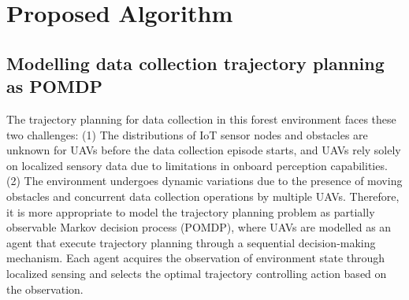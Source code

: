 \documentclass[conference]{IEEEtran}
\begin{document}
\section{Proposed Algorithm}\label{method}
\subsection{Modelling data collection trajectory planning as POMDP}
The trajectory planning for data collection in this forest environment faces these two challenges: 
(1) The distributions of IoT sensor nodes and obstacles are unknown for UAVs before the data collection episode starts, and UAVs rely solely on localized sensory data due to limitations in onboard perception capabilities. (2) The environment undergoes dynamic variations due to the presence of moving obstacles and concurrent data collection operations by multiple UAVs. Therefore, it is more appropriate to model the trajectory planning problem as partially observable Markov decision process (POMDP), where UAVs are modelled as an agent that execute trajectory planning through a sequential decision-making mechanism. Each agent acquires the observation of environment state through localized sensing and selects the optimal trajectory controlling action based on the observation. 
\end{document}
